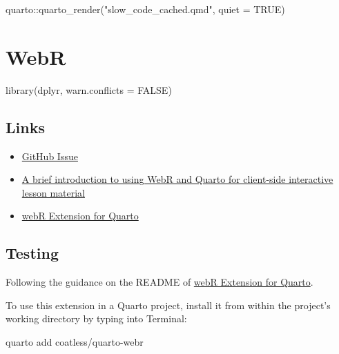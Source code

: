\documentclass[
  letterpaper,
  DIV=11,
  numbers=noendperiod]{scrreprt}
\newenvironment{Shaded}{\begin{snugshade}}{\end{snugshade}}
\newcommand{\AttributeTok}[1]{\textcolor[rgb]{0.40,0.45,0.13}{#1}}
\newcommand{\ConstantTok}[1]{\textcolor[rgb]{0.56,0.35,0.01}{#1}}
\newcommand{\FunctionTok}[1]{\textcolor[rgb]{0.28,0.35,0.67}{#1}}
\newcommand{\NormalTok}[1]{\textcolor[rgb]{0.00,0.23,0.31}{#1}}
\newcommand{\SpecialCharTok}[1]{\textcolor[rgb]{0.37,0.37,0.37}{#1}}
\newcommand{\StringTok}[1]{\textcolor[rgb]{0.13,0.47,0.30}{#1}}
\providecommand{\tightlist}{%
  \setlength{\itemsep}{0pt}\setlength{\parskip}{0pt}}\usepackage{longtable,booktabs,array}
\begin{document}
\begin{Shaded}
\begin{Highlighting}[]
\NormalTok{quarto}\SpecialCharTok{::}\FunctionTok{quarto\_render}\NormalTok{(}\StringTok{"slow\_code\_cached.qmd"}\NormalTok{, }\AttributeTok{quiet =} \ConstantTok{TRUE}\NormalTok{)}
\end{Highlighting}
\end{Shaded}

\chapter{WebR}\label{webr}

\begin{Shaded}
\begin{Highlighting}[]
\FunctionTok{library}\NormalTok{(dplyr, }\AttributeTok{warn.conflicts =} \ConstantTok{FALSE}\NormalTok{)}
\end{Highlighting}
\end{Shaded}

\section{Links}\label{links}

\begin{itemize}
\tightlist
\item
  \href{https://github.com/orgs/brad-cannell/projects/3/views/4?pane=issue&itemId=34978068}{GitHub
  Issue}
\item
  \href{https://jabberwocky.weecology.org/2023/03/13/a-brief-introduction-to-using-webr-and-quarto-for-client-side-interactive-lesson-material/}{A
  brief introduction to using WebR and Quarto for client-side
  interactive lesson material}
\item
  \href{https://github.com/coatless/quarto-webr}{webR Extension for
  Quarto}
\end{itemize}

\section{Testing}\label{testing}

Following the guidance on the README of
\href{https://github.com/coatless/quarto-webr}{webR Extension for
Quarto}.

To use this extension in a Quarto project, install it from within the
project's working directory by typing into Terminal:

\begin{Shaded}
\begin{Highlighting}[]
\NormalTok{quarto add coatless/quarto{-}webr}
\end{Highlighting}
\end{Shaded}
\end{document}
